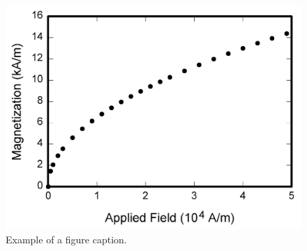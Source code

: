\documentclass[conference]{IEEEtran}
\begin{document}
\begin{figure}[htbp]
\centerline{\includegraphics{fig1.png}}
\caption{Example of a figure caption.}
\label{fig}
\end{figure}
\fi
\end{document}
